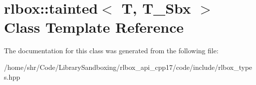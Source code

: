 \hypertarget{classrlbox_1_1tainted}{}\section{rlbox\+:\+:tainted$<$ T, T\+\_\+\+Sbx $>$ Class Template Reference}
\label{classrlbox_1_1tainted}


The documentation for this class was generated from the following file\+:\begin{DoxyCompactItemize}
\item 
/home/shr/\+Code/\+Library\+Sandboxing/rlbox\+\_\+api\+\_\+cpp17/code/include/rlbox\+\_\+types.\+hpp\end{DoxyCompactItemize}
